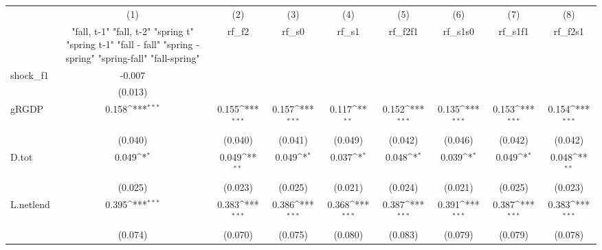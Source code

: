 {
\def\sym#1{\ifmmode^{#1}\else\(^{#1}\)\fi}
\begin{tabular}{l*{8}{c}}
\toprule
            &\multicolumn{1}{c}{(1)}&\multicolumn{1}{c}{(2)}&\multicolumn{1}{c}{(3)}&\multicolumn{1}{c}{(4)}&\multicolumn{1}{c}{(5)}&\multicolumn{1}{c}{(6)}&\multicolumn{1}{c}{(7)}&\multicolumn{1}{c}{(8)}\\
            &\multicolumn{1}{c}{  "fall, t-1" "fall, t-2" "spring t" "spring t-1"  "fall - fall" "spring - spring" "spring-fall" "fall-spring" }&\multicolumn{1}{c}{rf\_f2}&\multicolumn{1}{c}{rf\_s0}&\multicolumn{1}{c}{rf\_s1}&\multicolumn{1}{c}{rf\_f2f1}&\multicolumn{1}{c}{rf\_s1s0}&\multicolumn{1}{c}{rf\_s1f1}&\multicolumn{1}{c}{rf\_f2s1}\\
\midrule
shock\_f1    &      -0.007         &                     &                     &                     &                     &                     &                     &                     \\
            &     (0.013)         &                     &                     &                     &                     &                     &                     &                     \\
\addlinespace
gRGDP       &       0.158\sym{***}&       0.155\sym{***}&       0.157\sym{***}&       0.117\sym{**} &       0.152\sym{***}&       0.135\sym{***}&       0.153\sym{***}&       0.154\sym{***}\\
            &     (0.040)         &     (0.040)         &     (0.041)         &     (0.049)         &     (0.042)         &     (0.046)         &     (0.042)         &     (0.042)         \\
\addlinespace
D.tot       &       0.049\sym{*}  &       0.049\sym{**} &       0.049\sym{*}  &       0.037\sym{*}  &       0.048\sym{*}  &       0.039\sym{*}  &       0.049\sym{*}  &       0.048\sym{**} \\
            &     (0.025)         &     (0.023)         &     (0.025)         &     (0.021)         &     (0.024)         &     (0.021)         &     (0.025)         &     (0.023)         \\
\addlinespace
L.netlend   &       0.395\sym{***}&       0.383\sym{***}&       0.386\sym{***}&       0.368\sym{***}&       0.387\sym{***}&       0.391\sym{***}&       0.387\sym{***}&       0.383\sym{***}\\
            &     (0.074)         &     (0.070)         &     (0.075)         &     (0.080)         &     (0.083)         &     (0.079)         &     (0.079)         &     (0.078)         \\

\end{tabular}}
